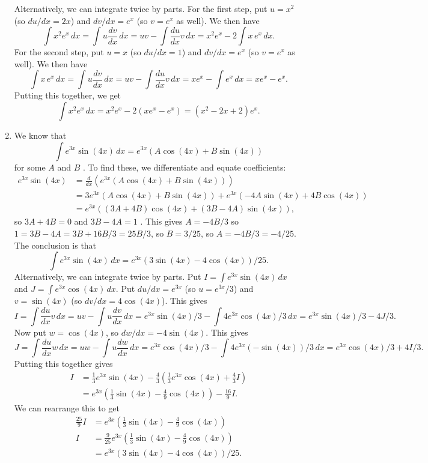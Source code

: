 \documentclass{amsart}
\renewcommand{\:}       {\colon}
\newcommand{\mks}[1]    {}
\newcommand{\mk}        {}
\begin{document}
\begin{enumerate}
  Alternatively, we can integrate twice by parts.  For the first step,
  put $u=x^2$ (so $du/dx=2x$) and $dv/dx=e^x$ (so $v=e^x$ as well).
  We then have
  \[ \int x^2e^x\,dx = \int u\frac{dv}{dx}\,dx = 
      uv - \int \frac{du}{dx} v\,dx = 
      x^2e^x - 2\int x\,e^x\,dx.
  \]
  For the second step, put $u=x$ (so $du/dx=1$) and $dv/dx=e^x$ (so
  $v=e^x$ as well).  We then have
  \[ \int x\,e^x\,dx = \int u\frac{dv}{dx}\,dx = 
      uv - \int \frac{du}{dx} v\,dx = 
      x e^x - \int e^x\,dx = x e^x - e^x.
  \]
  Putting this together, we get
  \[ \int x^2e^x\,dx = x^2e^x - 2(xe^x - e^x) = (x^2-2x+2)e^x. \] 

 \item %
  We know that 
  \[ \int e^{3x}\sin(4x)\,dx = e^{3x}(A\cos(4x) + B\sin(4x)) \]
  for some $A$ and $B$ \mks{2}.  To find these, we differentiate and
  equate coefficients: 
  \begin{align*}
   e^{3x}\sin(4x) &=
    \frac{d}{dx}\left(e^{3x}(A\cos(4x) + B\sin(4x))\right) \\
    &= 3e^{3x}(A\cos(4x) + B\sin(4x)) +
        e^{3x}(-4A\sin(4x) + 4B\cos(4x)) \\
    &= e^{3x}((3A+4B)\cos(4x) + (3B-4A)\sin(4x)) \mk,
  \end{align*}
  so $3A+4B=0$ and $3B-4A=1$ \mk.  This gives $A=-4B/3$ so
  $1=3B-4A=3B+16B/3=25B/3$, so $B=3/25$, so $A=-4B/3=-4/25$.  The
  conclusion is that
  \[ \int e^{3x}\sin(4x)\,dx = e^{3x}(3\sin(4x) - 4\cos(4x))/25. \mk \]
  Alternatively, we can integrate twice by parts.  Put
  $I=\int e^{3x}\sin(4x)\,dx$ and $J=\int e^{3x}\cos(4x)\,dx$.  Put
  $du/dx=e^{3x}$ (so $u=e^{3x}/3$) and $v=\sin(4x)$ (so
  $dv/dx=4\cos(4x)$).  This gives
  \[ I = \int \frac{du}{dx}v \,dx = 
      uv - \int u\frac{dv}{dx}\,dx = 
      e^{3x}\sin(4x)/3 - \int 4e^{3x}\cos(4x)/3\, dx = 
      e^{3x}\sin(4x)/3 - 4J/3.
  \]
  Now put $w=\cos(4x)$, so $dw/dx=-4\sin(4x)$.  This gives
  \[ J = \int \frac{du}{dx}w \,dx = 
      uw - \int u\frac{dw}{dx}\,dx = 
      e^{3x}\cos(4x)/3 - \int 4e^{3x}(-\sin(4x))/3\, dx = 
      e^{3x}\cos(4x)/3 + 4I/3.
  \]
  Putting this together gives
  \begin{align*}
   I &= \frac{1}{3}e^{3x}\sin(4x) -
        \frac{4}{3}\left(\frac{1}{3}e^{3x}\cos(4x) + \frac{4}{3}I\right) \\
     &= e^{3x}\left(\frac{1}{3}\sin(4x) - \frac{4}{9}\cos(4x)\right) - 
        \frac{16}{9}I.
  \end{align*}
  We can rearrange this to get
  \begin{align*}
   \frac{25}{9}I &=
    e^{3x}\left(\frac{1}{3}\sin(4x) - \frac{4}{9}\cos(4x)\right) \\
   I &= \frac{9}{25}e^{3x}
         \left(\frac{1}{3}\sin(4x) - \frac{4}{9}\cos(4x)\right) \\
     &= e^{3x}(3\sin(4x) - 4\cos(4x))/25.
  \end{align*}


\end{enumerate}
\end{document}
